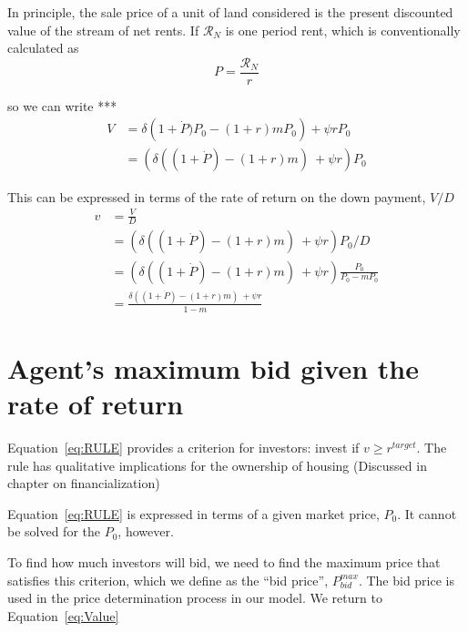 
In principle, the  sale price of a unit of land considered is the present discounted value of the stream of net rents. If $\mathcal{R}_N$ is one period rent, which is conventionally calculated as
\begin{equation}
  P=\frac{\mathcal{R}_N}{r}  \label{eq:Capitalization}
\end{equation}


\noindent so we can write ***
\begin{align}  
    V & = \delta \left(1+\dot P)  P_0- (1+r)mP_0 \right)  + \psi rP_0  \\
    & =\left( \delta ((1+\dot P)  - (1+r)m)\  + \psi r\right)P_0
\end{align}

This can be expressed in terms of the rate of return on the down payment, $V/D$
\begin{align}  
   v & = \frac{V}{D}
   \\
    & = \left( \delta ((1+\dot P)  - (1+r)m)\  + \psi r\right)P_0/D
   \\
    & = \left( \delta ((1+\dot P)  - (1+r)m)\  + \psi r\right) \frac{P_0}{P_0-mP_0}
    \\
    & =  \frac{\delta ((1+\dot P)  - (1+r)m)\  + \psi r}{1-m}\label{eq:RULE}
\end{align}


\section{Agent's maximum bid given the rate of return}
Equation~\ref{eq:RULE} provides a criterion for investors: invest if $v \geq r^{target}$. The rule has qualitative implications for the ownership of housing (Discussed in chapter on financialization)

Equation~\ref{eq:RULE} is expressed in terms of a given market price, $P_0$. It cannot be solved for the $P_0$, however.

To find how much investors will bid, we need to find the maximum price that satisfies this criterion, which we define as the ``bid price'', $P^{max}_{bid}$.   The bid price is used in the price determination process in our model. We return to Equation~\ref{eq:Value} %

